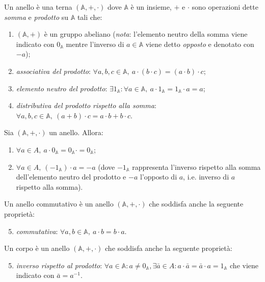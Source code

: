 \begin{definition}[Anello]
	Un anello è una terna $ (\mathbb{A}, +, \cdot) $ dove $ \mathbb{A} $ è un insieme, $ + $ e $ \cdot $ sono operazioni dette \emph{somma} e \emph{prodotto} su $ \mathbb{A} $ tali che:
	\begin{enumerate}[label = (\roman*)]
		\item $ (\mathbb{A}, +) $ è un gruppo abeliano (\emph{nota}: l'elemento neutro della somma viene indicato con $ 0_{\mathbb{A}} $ mentre l'inverso di $ a \in \mathbb{A} $ viene detto \emph{opposto} e denotato con $ - a $);
		\item \emph{associativa del prodotto}: $ \forall a, b, c \in \mathbb{A}, \ a \cdot (b \cdot c) = (a \cdot b) \cdot c $;
		\item \emph{elemento neutro del prodotto}: $ \exists 1_{\mathbb{A}} : \forall a \in \mathbb{A}, \ a \cdot 1_{\mathbb{A}} = 1_{\mathbb{A}} \cdot a = a $;
		\item \emph{distributiva del prodotto rispetto alla somma}: $ \forall a, b, c \in \mathbb{A}, \ (a + b) \cdot c = a \cdot b + b \cdot c $. 
	\end{enumerate}
\end{definition}

\begin{thm}
	Sia $ (\mathbb{A}, +, \cdot) $ un anello. Allora:
	\begin{enumerate}
		\item $ \forall a \in A, \ a \cdot 0_{\mathbb{A}} = 0_{\mathbb{A}} \cdot = 0_{\mathbb{A}} $;
		\item $ \forall a \in A, \ (- 1_{\mathbb{A}}) \cdot a = - a $ (dove $ - 1_{\mathbb{A}} $ rappresenta l'inverso rispetto alla somma dell'elemento neutro del prodotto e $ - a $ l'opposto di $ a $, i.e. inverso di $ a $ rispetto alla somma).
	\end{enumerate}
\end{thm}

\begin{definition}
	Un anello commutativo è un anello $ (\mathbb{A}, +, \cdot) $ che soddisfa anche la seguente proprietà:
	\begin{enumerate}[label = (\roman*)]
		\setcounter{enumi}{4}
		\item \emph{commutativa}: $ \forall a, b \in \mathbb{A}, \ a \cdot b = b \cdot a $.
	\end{enumerate}
\end{definition}

\begin{definition}[Corpo]
	Un corpo è un anello $ 
	(\mathbb{A}, +, \cdot) $ che soddisfa anche la seguente proprietà:
	\begin{enumerate}[label = (\roman*)]
		\setcounter{enumi}{4}
		\item \emph{inverso rispetto al prodotto}: $ \forall a \in \mathbb{A}: a \neq 0_{\mathbb{A}}, \exists \bar{a} \in A : a \cdot \bar{a} = \bar{a} \cdot a = 1_{\mathbb{A}} $ che viene indicato con $ \bar{a} = a^{-1} $.
	\end{enumerate}
\end{definition}

